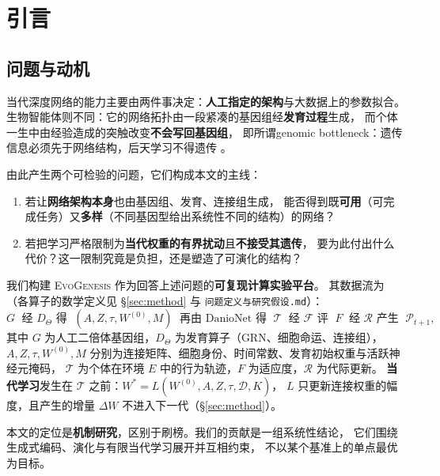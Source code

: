 \section{引言}\label{sec:intro}

\subsection{问题与动机}

当代深度网络的能力主要由两件事决定：\textbf{人工指定的架构}与大数据上的参数拟合。
生物智能体则不同：它的网络拓扑由一段紧凑的基因组经\textbf{发育过程}生成，
而个体一生中由经验造成的突触改变\textbf{不会写回基因组}，
即所谓genomic bottleneck：遗传信息必须先于网络结构，后天学习不得遗传
\citep{bib1_zador2019,bib2_barabasi2023,bib3_shuvaev2024}。

由此产生两个可检验的问题，它们构成本文的主线：

\begin{enumerate}
  \item 若让\textbf{网络架构本身}也由基因组、发育、连接组生成，
        能否得到既\textbf{可用}（可完成任务）又\textbf{多样}（不同基因型给出系统性不同的结构）的网络？
  \item 若把学习严格限制为\textbf{当代权重的有界扰动}且\textbf{不接受其遗传}，
        要为此付出什么代价？这一限制究竟是负担，还是塑造了可演化的结构？
\end{enumerate}

我们构建 \textsc{EvoGenesis} 作为回答上述问题的\textbf{可复现计算实验平台}。
其数据流为（各算子的数学定义见 \S\ref{sec:method} 与 \texttt{问题定义与研究假设.md}）：
\begin{equation}\label{eq:pipeline}
G\;\text{ 经 } D_{\Theta} \text{ 得 }\; (A,Z,\tau,W^{(0)},M)
\;\text{ 再由 DanioNet 得 }\; \mathcal{T}
\;\text{ 经 }\mathcal{F}\text{ 评 }\; F
\;\text{ 经 }\mathcal{R}\text{ 产生 }\; \mathcal{P}_{t+1},
\end{equation}
其中 $G$ 为人工二倍体基因组，$D_\Theta$ 为发育算子（GRN、细胞命运、连接组），
$A,Z,\tau,W^{(0)},M$ 分别为连接矩阵、细胞身份、时间常数、发育初始权重与活跃神经元掩码，
$\mathcal{T}$ 为个体在环境 $E$ 中的行为轨迹，$F$ 为适应度，$\mathcal R$ 为代际更新。
\textbf{当代学习}发生在 $\mathcal{T}$ 之前：$W^{*}=L(W^{(0)},A,Z,\tau,\mathcal{D},K)$，
$L$ 只更新连接权重的幅度，且产生的增量 $\Delta W$ 不进入下一代（\S\ref{sec:method}）。

本文的定位是\textbf{机制研究}，区别于刷榜。我们的贡献是一组系统性结论，
它们围绕生成式编码、演化与有限当代学习展开并互相约束，
不以某个基准上的单点最优为目标。


